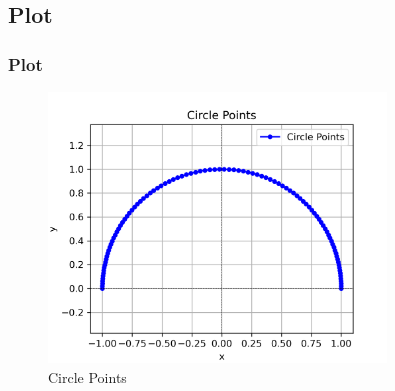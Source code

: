 \documentclass{beamer}
\theoremstyle{remark}
\numberwithin{equation}{section}
\begin{document}
\subsection{Plot}
\begin{frame}
	\frametitle{Plot}
\begin{figure}[h!]
    \centering
    \includegraphics[width=0.8\textwidth]{figs/plot.png} 
    \caption{Circle Points}
    \label{fig:circle_plot}
\end{figure}

\end{frame}
\end{document}
